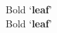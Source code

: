\documentclass{article}
\begin{document}
	\noindent
	Bold `{\bfseries leaf}'\\
	Bold `{\bfseries leaf\/}'\\
\end{document}
